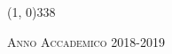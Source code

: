 \begin{titlepage}
\begin{center}
\begin{large}
\end{large}

\vspace{30pt}

\line(1, 0){338} \\
\begin{normalsize}
\textsc{Anno Accademico 2018-2019}
\end{normalsize}

\end{center}
\end{titlepage} 